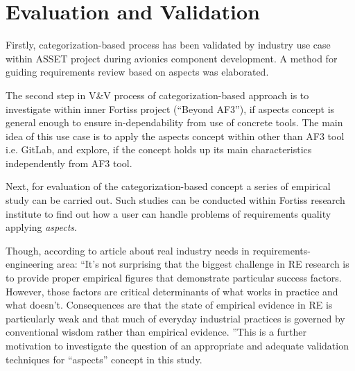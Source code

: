 \section{Evaluation and Validation}
Firstly, categorization-based process has been validated by industry use case within ASSET project during avionics component development. A method for guiding requirements review based on aspects was elaborated. 

The second step in V\&V process of categorization-based approach is to investigate within inner Fortiss project (``Beyond AF3”), if aspects concept is general enough to ensure  in-dependability from use of concrete tools. The main idea of this use case is to apply the aspects concept within other than AF3 tool i.e. GitLab, and explore, if the concept holds up its main characteristics independently from AF3 tool.

Next, for evaluation of the categorization-based concept a series of empirical study can be carried out. Such studies can be conducted within Fortiss research institute to find out how a user can handle problems of requirements quality applying \textit{aspects}.

Though, according to article about real industry needs in requirements-engineering area: ``It’s not surprising that the biggest challenge in RE research is to provide proper empirical figures that demonstrate particular success factors. However, those factors are critical determinants of what works in practice and what doesn’t.\cite{4citation} Consequences are that the state of empirical evidence in RE is particularly weak and that much of everyday industrial practices is governed by conventional wisdom rather than empirical evidence. \cite{16NaPiRe}''This is a further motivation to investigate the question of an appropriate and adequate validation techniques for ``aspects'' concept in this study.